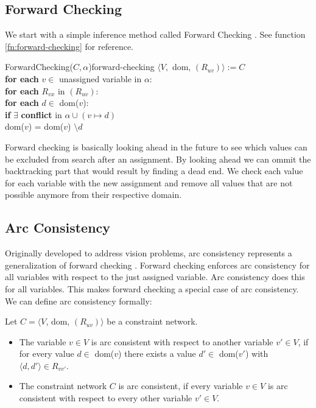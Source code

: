 \subsection{Forward Checking}

We start with a simple inference method called Forward Checking \cite{forward_checking:1980}. See function \ref{fn:forward-checking} for reference. \\

\begin{function}{ForwardChecking($C, \alpha$)}{forward-checking}
	$\langle V,$ dom, $(R_{uv})\rangle := C$ \\
	\textbf{for each} $v \in $ unassigned variable in $\alpha$: \\
	\null \qquad \textbf{for each} $R_{vx}$ in $(R_{uv})$: \\
	\null \qquad \qquad \textbf{for each} $d \in$ dom($v$): \\
	\null \qquad \qquad \qquad \textbf{if} $\exists$ \textbf{conflict} in $\alpha \cup (v \mapsto d)$ \\
	\null \qquad \qquad \qquad \qquad dom($v$) = dom($v$) $\setminus d$
\end{function}

Forward checking is basically looking ahead in the future to see which values can be excluded from search after an assignment. By looking ahead we can ommit the backtracking part that would result by finding a dead end. We check each value for each variable with the new assignment and remove all values that are not possible anymore from their respective domain.

\subsection{Arc Consistency}

Originally developed to address vision problems, arc consistency represents a generalization of forward checking \cite{original_arc:1988}. Forward checking enforces arc consistency for all variables with respect to the just assigned variable. Arc consistency does this for all variables. This makes forward checking a special case of arc consistency. We can define arc consistency formally:

\begin{tcolorbox}
	Let $C = \langle V$, dom, $(R_{uv})\rangle$ be a constraint network.
	\begin{itemize}
		\item The variable $v \in V$ is arc consistent with respect to another variable $v'\in V$, if for every value $d \in$ dom($v$) there exists a value $d' \in$ dom($v'$) with $\langle d, d' \rangle \in R_{vv'}$.
		\item The constraint network $C$ is arc consistent, if every variable $v \in V$ is arc consistent with respect to every other variable $v' \in V$.
	\end{itemize}
\end{tcolorbox}

